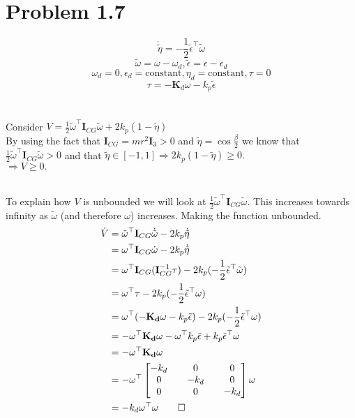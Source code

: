 \section*{Problem 1.7}

$$ \dot{\tilde \eta} = -\frac{1}{2} \tilde \epsilon^\top \tilde \omega $$
$$\tilde \omega = \omega - \omega_d, \tilde \epsilon = \epsilon - \epsilon_d $$
$$ \omega_d = 0, \epsilon_d = \text{constant}, \eta_d = \text{constant}, \tau = 0 $$
$$ \tau = -\mathbf{K}_d \omega - k_p \tilde \epsilon $$
\\ \\ Consider $V = \frac{1}{2} {\tilde \omega}^\top \mathbf{I}_{CG} \tilde \omega + 2k_p(1 - \tilde \eta)$
\\ By using the fact that $\mathbf{I}_{CG} = mr^2 \mathbf{I}_3 > 0$ and $\tilde \eta = \cos{\frac{\beta}{2}}$ we know that $\frac{1}{2} \tilde \omega^\top \mathbf{I}_{CG} \tilde \omega > 0$ and that $\tilde \eta \in [-1,1] \Rightarrow 2k_p(1 - \tilde \eta) \geq 0.$
\\ $\Rightarrow V \geq 0.$

\\ To explain how $V$ is unbounded we will look at $\frac{1}{2} \tilde \omega^\top \mathbf{I}_{CG} \tilde \omega.$ This increases towards infinity as $\tilde \omega$ (and therefore $\omega$) increases. Making the function unbounded.
\begin{align*}
 \dot V &= \tilde \omega^\top  \mathbf{I}_{CG} \dot{\tilde \omega} - 2k_p\dot{\tilde \eta} \\
    &=  \omega^\top  \mathbf{I}_{CG}\dot{ \omega} - 2k_p\dot{\tilde \eta}\\
    &=   \omega^\top  \mathbf{I}_{CG}(\mathbf{I}_{CG}^{-1} \tau) - 2k_p(-\frac{1}{2} \tilde \epsilon^\top \tilde \omega) \\
    &= \omega^\top  \tau - 2k_p(-\frac{1}{2} \tilde \epsilon^\top \omega) \\
    &= \omega^\top  (-\mathbf{K_d}\omega - k_p \tilde \epsilon) - 2k_p(-\frac{1}{2} \tilde \epsilon^\top  \omega) \\
    &= -\omega^\top \mathbf{K_d} \omega - \omega^\top k_p \tilde \epsilon + k_p \tilde \epsilon^\top \omega \\
    &= -\omega^\top \mathbf{K_d} \omega \\
    &= -\omega^\top \begin{bmatrix}-k_d && 0 && 0 \\ 0 && -k_d && 0 \\ 0 && 0 && -k_d\end{bmatrix} \omega \\
    &= -k_d \omega^\top \omega \qed
\end{align*}
\\ \\ 

